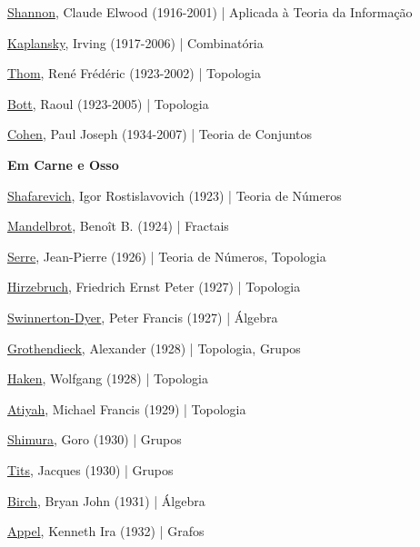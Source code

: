 \documentclass[12pt,a4paper]{article}
\begin{document}
			\href{http://en.wikipedia.org/wiki/Claude_Shannon}{Shannon}, Claude Elwood (1916-2001) | Aplicada \`a Teoria da Informa\c{c}\~ao

			\href{http://en.wikipedia.org/wiki/Irving_Kaplansky}{Kaplansky}, Irving (1917-2006) | Combinat\'oria

			\href{http://en.wikipedia.org/wiki/Ren\%C3\%A9_Thom}{Thom}, Ren\'e Fr\'ed\'eric (1923-2002) | Topologia

			\href{http://en.wikipedia.org/wiki/Raoul_Bott}{Bott}, Raoul (1923-2005) | Topologia

			\href{http://en.wikipedia.org/wiki/Paul_Cohen_(mathematician)}{Cohen}, Paul Joseph (1934-2007) | Teoria de Conjuntos

			\begin{flushright}
			\end{flushright}

			\textbf{Em Carne e Osso}

			\href{http://en.wikipedia.org/wiki/Shafarevich}{Shafarevich}, Igor Rostislavovich (1923) | Teoria de N\'umeros

			\href{http://en.wikipedia.org/wiki/Beno\%C3\%AEt_Mandelbrot}{Mandelbrot}, Benoît B. (1924) | Fractais

			\href{http://en.wikipedia.org/wiki/Jean-Pierre_Serre}{Serre}, Jean-Pierre (1926) | Teoria de N\'umeros, Topologia

			\href{http://en.wikipedia.org/wiki/Friedrich_Hirzebruch}{Hirzebruch}, Friedrich Ernst Peter (1927) | Topologia

			\href{http://en.wikipedia.org/wiki/Henry_Peter_Francis_Swinnerton-Dyer}{Swinnerton-Dyer}, Peter Francis (1927) | \'Algebra

			\href{http://en.wikipedia.org/wiki/Grothendieck}{Grothendieck}, Alexander (1928) | Topologia, Grupos

			\href{http://en.wikipedia.org/wiki/Wolfgang_Haken}{Haken}, Wolfgang (1928) | Topologia

			\href{http://en.wikipedia.org/wiki/Michael_Atiyah}{Atiyah}, Michael Francis (1929) | Topologia

			\href{http://en.wikipedia.org/wiki/Goro_Shimura}{Shimura}, Goro (1930) | Grupos

			\href{http://en.wikipedia.org/wiki/Jacques_Tits}{Tits}, Jacques (1930) | Grupos

			\href{http://en.wikipedia.org/wiki/Bryan_Birch}{Birch}, Bryan John (1931) | \'Algebra

			\href{http://en.wikipedia.org/wiki/Kenneth_Appel}{Appel}, Kenneth Ira (1932) | Grafos
\end{document}
